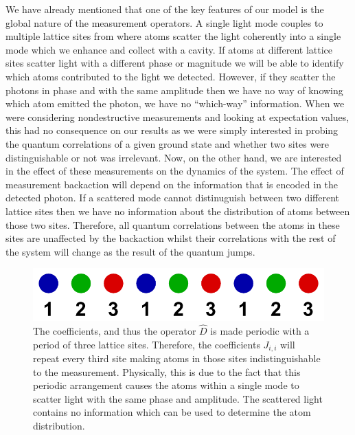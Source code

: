 We have already mentioned that one of the key features of our model is
the global nature of the measurement operators. A single light mode
couples to multiple lattice sites from where atoms scatter the light
coherently into a single mode which we enhance and collect with a
cavity. If atoms at different lattice sites scatter light with a
different phase or magnitude we will be able to identify which atoms
contributed to the light we detected. However, if they scatter the
photons in phase and with the same amplitude then we have no way of
knowing which atom emitted the photon, we have no ``which-way''
information. When we were considering nondestructive measurements and
looking at expectation values, this had no consequence on our results
as we were simply interested in probing the quantum correlations of a
given ground state and whether two sites were distinguishable or not
was irrelevant. Now, on the other hand, we are interested in the
effect of these measurements on the dynamics of the system. The effect
of measurement backaction will depend on the information that is
encoded in the detected photon. If a scattered mode cannot
distinuguish between two different lattice sites then we have no
information about the distribution of atoms between those two sites.
Therefore, all quantum correlations between the atoms in these sites
are unaffected by the backaction whilst their correlations with the
rest of the system will change as the result of the quantum jumps.

\begin{figure}[htbp!]
  \centering
  \includegraphics[width=1.0\textwidth]{1DModes}
  \caption[1D Modes due to Measurement Backaction]{The coefficients,
    and thus the operator $\hat{D}$ is made periodic with a period of
    three lattice sites. Therefore, the coefficients $J_{i,i}$ will
    repeat every third site making atoms in those sites
    indistinguishable to the measurement. Physically, this is due to
    the fact that this periodic arrangement causes the atoms within a
    single mode to scatter light with the same phase and amplitude.
    The scattered light contains no information which can be used to
    determine the atom distribution.}
  \label{fig:1dmodes}
\end{figure}


